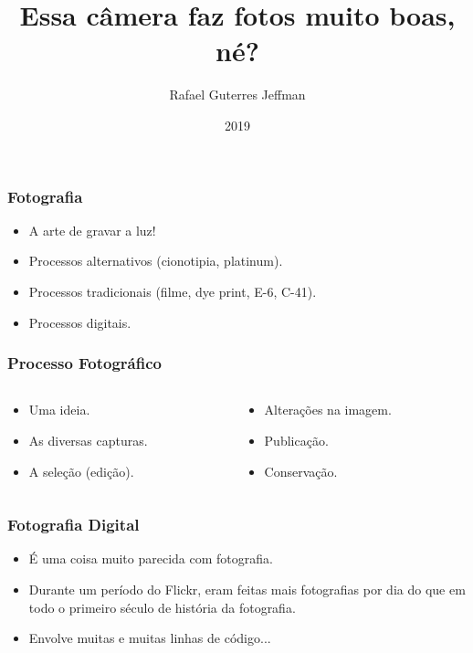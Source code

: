 


\title{Essa câmera faz fotos muito boas, né?}
\subtitle{}
\author{Rafael Guterres Jeffman}
\institute{}
\date{2019}



\coverframe

\begin{frame}
    \frametitle{Fotografia}
    \begin{itemize}
        \item A arte de gravar a luz!
        \item Processos alternativos (cionotipia, platinum).
        \item Processos tradicionais (filme, dye print, E-6, C-41).
        \item Processos digitais.
    \end{itemize}
\end{frame}


\begin{frame}
    \frametitle{Processo Fotográfico}
    \begin{columns}
        \begin{column}{0.4\textwidth}
            \begin{itemize}
                \item Uma ideia.
                \item As diversas capturas.
                \item A seleção (edição).
            \end{itemize}
        \end{column}
        \begin{column}{0.5\textwidth}
            \begin{itemize}
                \item Alterações na imagem.
                \item Publicação.
                \item Conservação.
            \end{itemize}
        \end{column}
    \end{columns}
\end{frame}


\begin{frame}
    \frametitle{Fotografia Digital}
    \begin{itemize}
        \item É uma coisa muito parecida com fotografia.
        \item Durante um período do Flickr, eram feitas mais fotografias por
        dia do que em todo o primeiro século de história da fotografia.
        \vfill
        \item Envolve muitas e muitas linhas de código...
    \end{itemize}
\end{frame}

